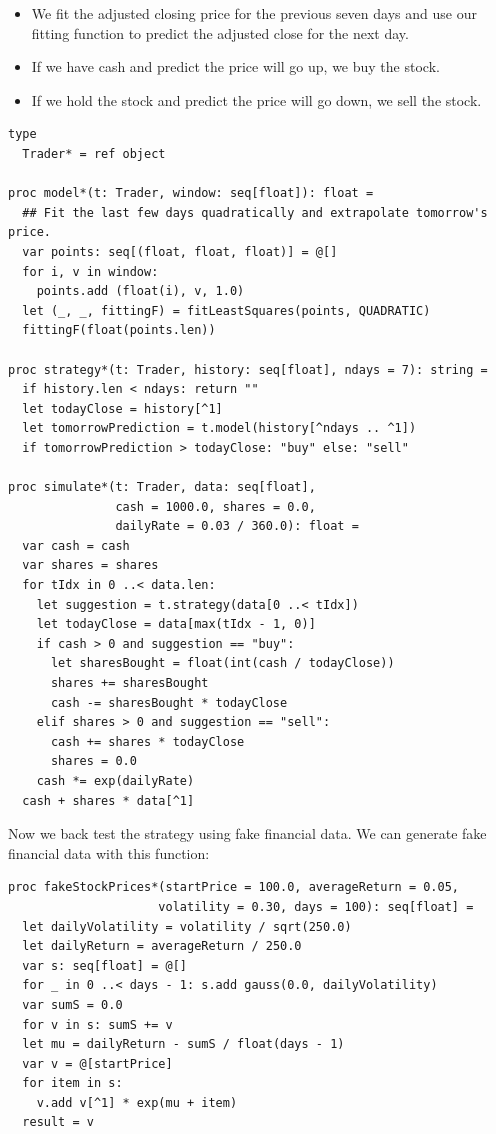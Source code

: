 \documentclass[justified, sixbynine]{tufte-book}
\def\ft{\small\tt}
\theoremstyle{plain}%
\newtheorem * {corollary}{Corollary}
\theoremstyle{definition}
\theoremstyle{remark}
\newtheorem * {remark}{Remark}
\newtheorem * {note}{Note}
\begin{document}
\begin{fullwidth}
\begin{itemize}
\item We fit the adjusted closing price for the previous seven days and use our fitting function to predict the adjusted close for the next day.
\item If we have cash and predict the price will go up, we buy the stock.
\item If we hold the stock and predict the price will go down, we sell the stock.
\end{itemize}


\begin{lstlisting}[caption={in file: {\ft nlib.nim}}]
type
  Trader* = ref object

proc model*(t: Trader, window: seq[float]): float =
  ## Fit the last few days quadratically and extrapolate tomorrow's price.
  var points: seq[(float, float, float)] = @[]
  for i, v in window:
    points.add (float(i), v, 1.0)
  let (_, _, fittingF) = fitLeastSquares(points, QUADRATIC)
  fittingF(float(points.len))

proc strategy*(t: Trader, history: seq[float], ndays = 7): string =
  if history.len < ndays: return ""
  let todayClose = history[^1]
  let tomorrowPrediction = t.model(history[^ndays .. ^1])
  if tomorrowPrediction > todayClose: "buy" else: "sell"

proc simulate*(t: Trader, data: seq[float],
               cash = 1000.0, shares = 0.0,
               dailyRate = 0.03 / 360.0): float =
  var cash = cash
  var shares = shares
  for tIdx in 0 ..< data.len:
    let suggestion = t.strategy(data[0 ..< tIdx])
    let todayClose = data[max(tIdx - 1, 0)]
    if cash > 0 and suggestion == "buy":
      let sharesBought = float(int(cash / todayClose))
      shares += sharesBought
      cash -= sharesBought * todayClose
    elif shares > 0 and suggestion == "sell":
      cash += shares * todayClose
      shares = 0.0
    cash *= exp(dailyRate)
  cash + shares * data[^1]
\end{lstlisting}

Now we back test the strategy using fake financial data. We can generate fake financial data with this function:

\begin{lstlisting}[caption={in file: {\ft nlib.nim}}]
proc fakeStockPrices*(startPrice = 100.0, averageReturn = 0.05,
                     volatility = 0.30, days = 100): seq[float] =
  let dailyVolatility = volatility / sqrt(250.0)
  let dailyReturn = averageReturn / 250.0
  var s: seq[float] = @[]
  for _ in 0 ..< days - 1: s.add gauss(0.0, dailyVolatility)
  var sumS = 0.0
  for v in s: sumS += v
  let mu = dailyReturn - sumS / float(days - 1)
  var v = @[startPrice]
  for item in s:
    v.add v[^1] * exp(mu + item)
  result = v
\end{lstlisting}


\end{fullwidth}
\end{document}
